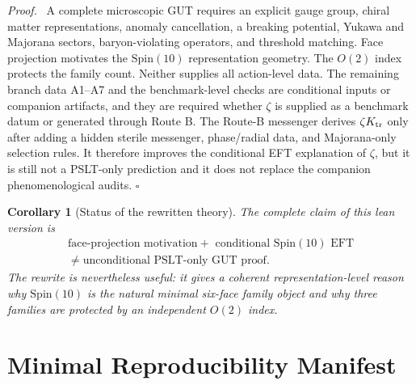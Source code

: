 \documentclass[
  aps,
  prd,
  preprint,
  nofootinbib,
  superscriptaddress,
  longbibliography
]{revtex4-2}
\newcommand{\Spin}{\mathrm{Spin}}
\newtheorem{corollary}[theorem]{Corollary}
\newenvironment{proof}{\par\noindent\textit{Proof.}\ }{\hfill\(\square\)\par}
\begin{document}
\begin{proof}
A complete microscopic GUT requires an explicit gauge group, chiral matter
representations, anomaly cancellation, a breaking potential, Yukawa and
Majorana sectors, baryon-violating operators, and threshold matching.
Face projection motivates the \(\Spin(10)\) representation geometry.
The \(O(2)\) index protects the family count.  Neither supplies all
action-level data.  The remaining branch data A1--A7 and the benchmark-level
checks are conditional inputs or companion artifacts, and they are required
whether \(\zeta\) is supplied as a benchmark datum or generated through Route
B.  The Route-B messenger derives \(\zeta K_{\rm tr}\) only after adding a
hidden sterile messenger, phase/radial data, and Majorana-only selection
rules.  It therefore improves the conditional EFT explanation of \(\zeta\),
but it is still not a PSLT-only prediction and it does not replace the
companion phenomenological audits.
\end{proof}

\begin{corollary}[Status of the rewritten theory]
The complete claim of this lean version is
\[
\boxed{
\begin{gathered}
\text{face-projection motivation}
+\text{ conditional }\Spin(10)\text{ EFT}\\
\neq
\text{unconditional PSLT-only GUT proof}.
\end{gathered}
}
\]
The rewrite is nevertheless useful: it gives a coherent representation-level
reason why \(\Spin(10)\) is the natural minimal six-face family object and why
three families are protected by an independent \(O(2)\) index.
\end{corollary}

\section{Minimal Reproducibility Manifest}
\end{document}
